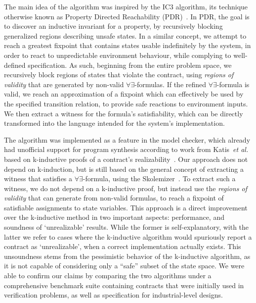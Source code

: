 The main idea of the algorithm was inspired by the IC3 algorithm, its
technique otherwise known as Property Directed Reachability
(PDR)~\cite{bradley2011sat,een2011efficient}. In PDR, the goal is to discover an
inductive invariant for a property, by recursively blocking generalized regions describing unsafe states. In a similar concept, we attempt
to reach a greatest fixpoint that contains states usable indefinitely by the
system, in order to react to unpredictable environment behaviour, while
complying to well-defined specification. As such, beginning from the entire
problem space, we recursively block regions of states that violate the contract, using \textit{regions of validity} that are
generated by non-valid $\forall\exists$-formulas. If the refined
$\forall\exists$-formula is valid, we reach an approximation of a fixpoint which can effectively be used by the specified transition relation, to
provide safe reactions to environment inputs. We then extract a witness for the
formula's satisfiability, which can be directly transformed into the
language intended for the system's implementation.

The algorithm was implemented as a feature in the \jkind model checker, which
already had unofficial support for program synthesis according to work from
Katis~\textit{et al.} based on k-inductive proofs of a contract's
realizability~\cite{gacek2015towards,katis2016towards,katis2016synthesis}.
Our approach does not depend on k-induction, but is still based on the general
concept of extracting a witness that satisfies a $\forall\exists$-formula, using
the \aeval Skolemizer~\cite{fedyukovich2015automated}. To extract such a witness, we do not depend on a k-inductive proof, but instead use the \textit{regions of validity} that \aeval can generate from non-valid formulas,
to reach a fixpoint of satisfiable assignments to state variables.
This approach is a direct improvement over the k-inductive method in two
important aspects: performance, and soundness of `unrealizable' results. While
the former is self-explanatory, with the latter we refer to cases where the
k-inductive algorithm would spuriously report a contract as `unrealizable', when a correct
implementation actually exists. This unsoundness stems from the pessimistic
behavior of the k-inductive algorithm, as it is not capable of
considering only a
``safe'' subset of the state space. We were able to confirm our claims
by comparing the two algorithms under a comprehensive benchmark suite containing
contracts that were initially used in verification problems, as well as
specification for industrial-level designs.

